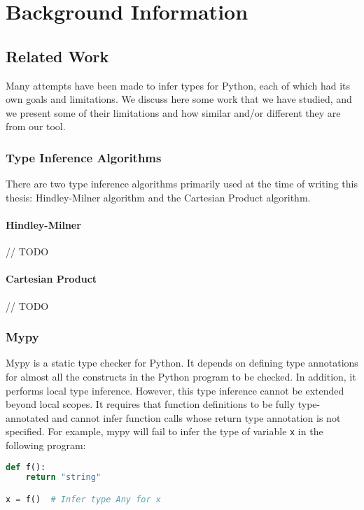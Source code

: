 
\chapter{Background Information}\label{chapter:background}

\section{Related Work}
Many attempts have been made to infer types for Python, each of which had its own goals and limitations. We discuss here some work that we have studied, and we present some of their limitations and how similar and/or different they are from our tool.

\subsection{Type Inference Algorithms}
There are two type inference algorithms primarily used at the time of writing this thesis: Hindley-Milner algorithm and the Cartesian Product algorithm.

\subsubsection{Hindley-Milner}
// TODO
\subsubsection{Cartesian Product}
// TODO

\subsection{Mypy \cite{mypy}}
Mypy is a static type checker for Python. It depends on defining type annotations for almost all the constructs in the Python program to be checked. In addition, it performs local type inference. However, this type inference cannot be extended beyond local scopes. It requires that function definitions to be fully type-annotated and cannot infer function calls whose return type annotation is not specified. For example, mypy will fail to infer the type of variable \lstinline|x| in the following program:

\begin{lstlisting}[language=Python]
def f():
	return "string"

x = f()  # Infer type Any for x
\end{lstlisting}

